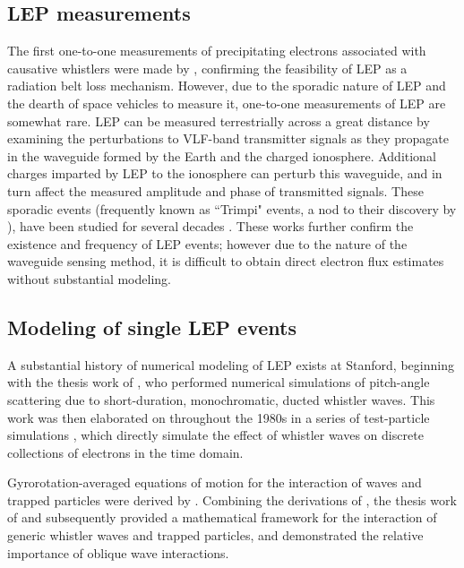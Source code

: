 \subsection{LEP measurements}
The first one-to-one measurements of precipitating electrons associated with causative whistlers were made by \cite{Voss1984}, confirming the feasibility of LEP as a radiation belt loss mechanism. However, due to the sporadic nature of LEP and the dearth of space vehicles to measure it, one-to-one measurements of LEP are somewhat rare.
LEP can be measured terrestrially across a great distance by examining the perturbations to VLF-band transmitter signals as they propagate in the waveguide formed by the Earth and the charged ionosphere. Additional charges imparted by LEP to the ionosphere can perturb this waveguide, and in turn affect the measured amplitude and phase of transmitted signals. These sporadic events (frequently known as ``Trimpi" events, a nod to their discovery by \cite{Trimpi1973}), have been studied for several decades \citep{Trimpi1973, Carpenter1984, Inan1988, Burgess1993}. These works further confirm the existence and frequency of LEP events; however due to the nature of the waveguide sensing method, it is difficult to obtain direct electron flux estimates without substantial modeling.

\subsection{Modeling of single LEP events}
A substantial history of numerical modeling of LEP exists at Stanford, beginning with the thesis work of \cite{Inan1977}, who performed numerical simulations of pitch-angle scattering due to short-duration, monochromatic, ducted whistler waves. This work was then elaborated on throughout the 1980s in a series of test-particle simulations \citep{Chang1983, Chang1985, Inan1989}, which directly simulate the effect of whistler waves on discrete collections of electrons in the time domain.

Gyrorotation-averaged equations of motion for the interaction of waves and trapped particles were derived by \cite{Bell1984}. Combining the derivations of \cite{Ristic1992}, the thesis work of \cite{Ristic1993} and subsequently \cite{Ristic1998} provided a mathematical framework for the interaction of generic whistler waves and trapped particles, and demonstrated the relative importance of oblique wave interactions. 

